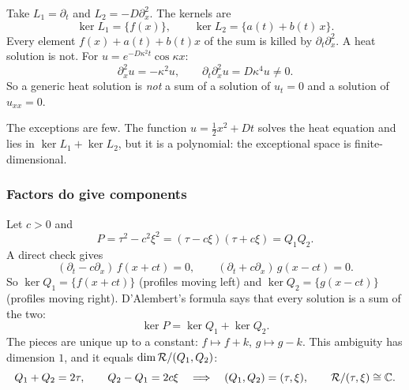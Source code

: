 \begin{example}
Take $L_1=\partial_t$ and $L_2=-D\partial_x^2$. The kernels are
\[
\ker L_1=\{f(x)\},\qquad \ker L_2=\{a(t)+b(t)\,x\}.
\]
Every element $f(x)+a(t)+b(t)x$ of the sum is killed by $\partial_t\partial_x^2$. A heat solution is not. For $u=e^{-D\kappa^2t}\cos\kappa x$:
\[
\partial_x^2u=-\kappa^2u,\qquad \partial_t\partial_x^2u=D\kappa^4u\neq0 .
\]
So a generic heat solution is \emph{not} a sum of a solution of $u_t=0$ and a solution of $u_{xx}=0$.

The exceptions are few. The function $u=\tfrac12x^2+Dt$ solves the heat equation and lies in $\ker L_1+\ker L_2$, but it is a polynomial: the exceptional space is finite-dimensional.
\end{example}

\subsubsection{Factors do give components}

\begin{example}\label{ex:wave}
Let $c>0$ and
\[
P=\tau^2-c^2\xi^2=(\tau-c\xi)(\tau+c\xi)=Q_1Q_2 .
\]
A direct check gives
\[
(\partial_t-c\partial_x)\,f(x+ct)=0,\qquad (\partial_t+c\partial_x)\,g(x-ct)=0 .
\]
So $\ker Q_1=\{f(x+ct)\}$ (profiles moving left) and $\ker Q_2=\{g(x-ct)\}$ (profiles moving right). D'Alembert's formula says that every solution is a sum of the two:
\[
\ker P=\ker Q_1+\ker Q_2 .
\]
The pieces are unique up to a constant: $f\mapsto f+k$, $g\mapsto g-k$. This ambiguity has dimension $1$, and it equals $\operatorname{dim}\mathcal{R}/(Q_1,Q_2)$:
\[
Q_1+Q_2=2\tau,\qquad Q_2-Q_1=2c\xi\quad\Longrightarrow\quad(Q_1,Q_2)=(\tau,\xi),\qquad \mathcal{R}/(\tau,\xi)\cong\mathbb{C} .
\]
\end{example}

